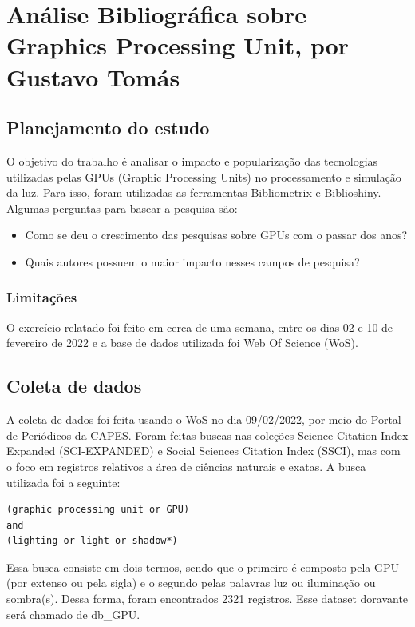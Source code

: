 
\chapter{Análise Bibliográfica sobre Graphics Processing Unit, por Gustavo Tomás}

\section{Planejamento do estudo}

O objetivo do trabalho é analisar o impacto e popularização das tecnologias utilizadas pelas GPUs (Graphic Processing Units) no processamento e simulação da luz. Para isso, foram utilizadas as ferramentas Bibliometrix e Biblioshiny. Algumas perguntas para basear a pesquisa são:

\begin{itemize}
    \item Como se deu o crescimento das pesquisas sobre GPUs com o passar dos anos?
    \item Quais autores possuem o maior impacto nesses campos de pesquisa?
\end{itemize}

\subsection{Limitações} O exercício relatado foi feito em cerca de uma semana, entre os dias 02 e 10 de fevereiro de 2022 e a base de dados utilizada foi Web Of Science (WoS).

\section{Coleta de dados}

A coleta de dados foi feita usando o WoS no dia 09/02/2022, por meio do Portal de Periódicos da CAPES. Foram feitas buscas nas coleções Science Citation Index Expanded (SCI-EXPANDED) e Social Sciences Citation Index (SSCI), mas com o foco em registros relativos a área de ciências naturais e exatas. A busca utilizada foi a seguinte:

\begin{verbatim}
(graphic processing unit or GPU) 
and
(lighting or light or shadow*)
\end{verbatim}

Essa busca consiste em dois termos, sendo que o primeiro é composto pela GPU (por extenso ou pela sigla) e o segundo pelas palavras luz ou iluminação ou sombra(s). Dessa forma, foram encontrados 2321 registros. Esse dataset doravante será chamado de db\_GPU.

